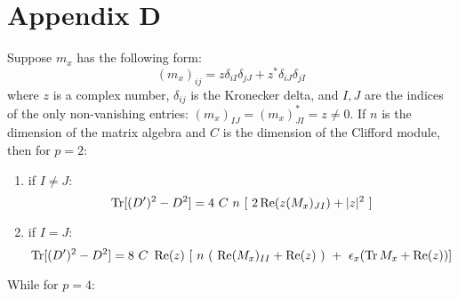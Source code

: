 \section*{Appendix D}
Suppose $m_x$ has the following form:
\begin{equation}
(m_x)_{ij} = z \delta_{iI} \delta_{jJ} + z^* \delta_{iJ} \delta_{jI}
\end{equation}
where $z$ is a complex number, $\delta_{ij}$ is the Kronecker delta, and $I, J$ are the indices of the only non-vanishing entries: $(m_x)_{IJ} = (m_x)_{JI}^* = z \neq 0$. \newline
If $n$ is the dimension of the matrix algebra and $C$ is the dimension of the Clifford module, then for $p=2$:
\begin{enumerate}
\item if $I \neq J$:
\begin{equation}
\operatorname{Tr} [(D')^2 - D^2] = 4 \ C \ n \ [ \ 2 \operatorname{Re} ( z(M_x)_{JI} ) + |z|^2 \ ]
\end{equation}
\item if $I = J$:
\begin{equation}
\Tr [(D')^2 - D^2] = 8 \ C \ \Real(z) \ [ \ n \ ( \ \Real (M_x)_{II}  + \Real(z) \ ) \ + \ \epsilon_x(\Tr M_x + \Real(z))  ]
\end{equation}
\end{enumerate}
While for $p=4$:\newline
